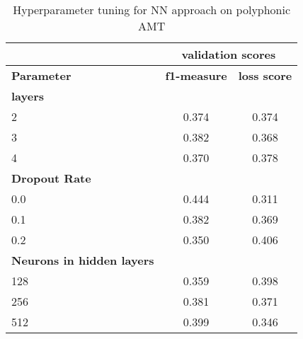 \begin{table}
    \centering
    \begin{tabular}{|l|c|c|}
        \hline
                                          & \multicolumn{2}{c|}{\textbf{validation scores}}                                            \\ \hline
        \textbf{Parameter}                & \multicolumn{1}{l|}{\textbf{f1-measure}}        & \multicolumn{1}{l|}{\textbf{loss score}} \\ \hline
        \textbf{layers}                   & \multicolumn{1}{l|}{}                           & \multicolumn{1}{l|}{}                    \\ \hline
        2                                 & 0.374                                           & 0.374                                    \\ \hline
        3                                 & 0.382                                           & 0.368                                    \\ \hline
        4                                 & 0.370                                           & 0.378                                    \\ \hline
        \textbf{Dropout Rate}             & \multicolumn{1}{l|}{}                           & \multicolumn{1}{l|}{}                    \\ \hline
        0.0                               & 0.444                                           & 0.311                                    \\ \hline
        0.1                               & 0.382                                           & 0.369                                    \\ \hline
        0.2                               & 0.350                                           & 0.406                                    \\ \hline
        \textbf{Neurons in hidden layers} & \multicolumn{1}{l|}{}                           & \multicolumn{1}{l|}{}                    \\ \hline
        128                               & 0.359                                           & 0.398                                    \\ \hline
        256                               & 0.381                                           & 0.371                                    \\ \hline
        512                               & 0.399                                           & 0.346                                    \\ \hline
    \end{tabular}
    \caption[Hyperparameter gridsearch NN]{Hyperparameter tuning for \ac{NN} approach on polyphonic \ac{AMT}}
    \label{results:table:nn-grid}
\end{table}


